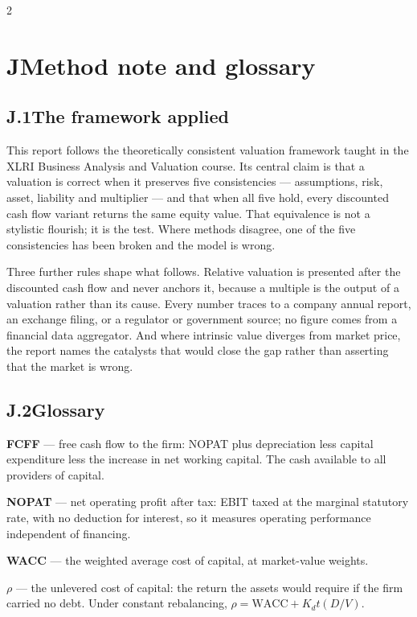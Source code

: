 \begin{paracol}{2}
\section*{J\quad Method note and glossary}

\subsection*{J.1\quad The framework applied}

This report follows the theoretically consistent valuation framework taught in the
XLRI Business Analysis and Valuation course. Its central claim is that a valuation is
correct when it preserves five consistencies — assumptions, risk, asset, liability and
multiplier — and that when all five hold, every discounted cash flow variant returns
the same equity value. That equivalence is not a stylistic flourish; it is the test.
Where methods disagree, one of the five consistencies has been broken and the model is
wrong.

Three further rules shape what follows. Relative valuation is presented after the
discounted cash flow and never anchors it, because a multiple is the output of a
valuation rather than its cause. Every number traces to a company annual report, an
exchange filing, or a regulator or government source; no figure comes from a financial
data aggregator. And where intrinsic value diverges from market price, the report names
the catalysts that would close the gap rather than asserting that the market is wrong.

\subsection*{J.2\quad Glossary}

\textbf{FCFF} --- free cash flow to the firm: NOPAT plus depreciation less capital
expenditure less the increase in net working capital. The cash available to all
providers of capital.

\textbf{NOPAT} --- net operating profit after tax: EBIT taxed at the marginal statutory
rate, with no deduction for interest, so it measures operating performance independent
of financing.

\textbf{WACC} --- the weighted average cost of capital, at market-value weights.

\textbf{$\rho$} --- the unlevered cost of capital: the return the assets would require
if the firm carried no debt. Under constant rebalancing, $\rho = \text{WACC} + K_d
t(D/V)$.


\end{paracol}
